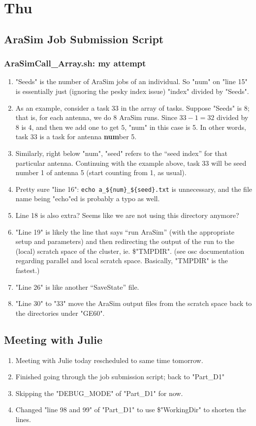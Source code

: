\documentclass[12pt,letterpaper]{article}
\begin{document}
\section{Thu}
\subsection{AraSim Job Submission Script}
\subsubsection{AraSimCall\_Array.sh: my attempt}
\begin{enumerate}
  \item "Seeds" is the number of AraSim jobs of an individual. So "num" on "line 15" is
    essentially just (ignoring the pesky index issue) "index" divided by "Seeds".
  \item As an example, consider a task 33 in the array of tasks. Suppose "Seeds" is 8; 
    that is, for each antenna, we do 8 AraSim runs. Since $33-1=32$ divided by 8 is 4,
    and then we add one to get $5$, "num" in this case is 5. In other words, task 33 is
    a task for antenna \textbf{num}ber 5.
  \item Similarly, right below "num", "seed" refers to the ``seed index'' for that 
    particular antenna. Continuing with the example above, task 33 will be seed number
    1 of antenna 5 (start counting from 1, as usual).
  \item Pretty sure "line 16": \verb|echo a_${num}_${seed}.txt| is
    unnecessary, and the file name being "echo"ed is probably a typo as well. 
  \item Line 18 is also extra? Seems like we are not using this directory anymore?
  \item "Line 19" is likely the line that says ``run AraSim'' (with the appropriate
    setup and parameters) and then redirecting the output of the run to the (local)
    scratch space of the cluster, ie. \$"TMPDIR". (see osc documentation regarding 
    parallel and local scratch space. Basically, "TMPDIR" is the fastest.)
  \item "Line 26" is like another ``SaveState'' file.
  \item "Line 30" to "33" move the AraSim output files from the scratch space back to
    the directories under "GE60".
\end{enumerate}

\subsection{Meeting with Julie}
\begin{enumerate}
  \item Meeting with Julie today rescheduled to same time tomorrow.
  \item Finished going through the job submission script; back to "Part_D1"
  \item Skipping the "DEBUG_MODE" of "Part_D1" for now.
  \item Changed "line 98 and 99" of "Part_D1" to use \$"WorkingDir" to shorten the lines.
\end{enumerate}
\end{document}
